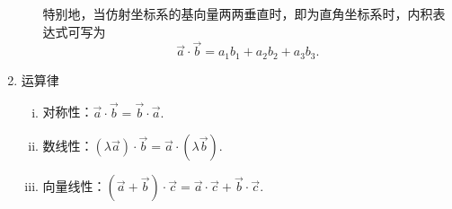\begin{enumerate}[1.]
\begin{enumerate}[]
		\hspace*{2em}特别地，当仿射坐标系的基向量两两垂直时，即为直角坐标系时，内积表达式可写为
		\begin{equation}
			\overrightarrow{a} \cdot \overrightarrow{b}=a_1b_1+a_2b_2+a_3b_3.
		\end{equation}
	\end{enumerate}
	\item {\color{dy2}运算律}
	\begin{enumerate}[i.]
				\setlength{\itemindent}{1.5em} 
		\setlength{\topsep}{0.01em}
		\setlength{\itemsep}{0.01em}
		\item 对称性：$\overrightarrow{a}\cdot \overrightarrow{b}=\overrightarrow{b}\cdot \overrightarrow{a}.$
		\item 数线性：$(\lambda\overrightarrow{a})\cdot \overrightarrow{b}=\overrightarrow{a}\cdot (\lambda \overrightarrow{b}).$
		\item 向量线性：$(\overrightarrow{a}+\overrightarrow{b})\cdot \overrightarrow{c}=\overrightarrow{a}\cdot \overrightarrow{c}+\overrightarrow{b}\cdot\overrightarrow{c}.$
	\end{enumerate}
\end{enumerate}
\jg
\jg
